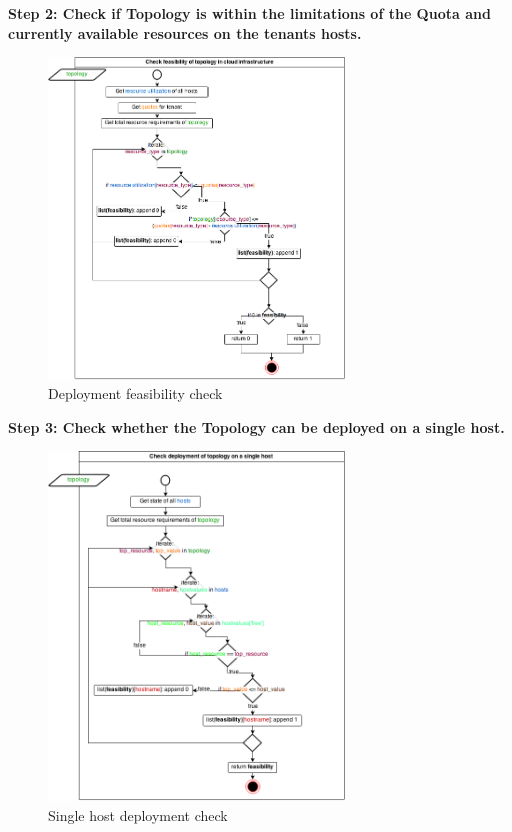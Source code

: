 \textbf{Step 2: Check if Topology is within the limitations of the Quota and currently available resources on the tenants hosts.}

\begin{figure}[H]
\centering

\includegraphics[width=0.7\textwidth]{images/design/cm_feasibility_check}

\caption{Deployment feasibility check}
\end{figure}


\textbf{Step 3: Check whether the Topology can be deployed on a single host.}

\begin{figure}[H]
\centering

\includegraphics[width=0.7\textwidth]{images/design/cm_single_host_check}

\caption{Single host deployment check}
\end{figure}


